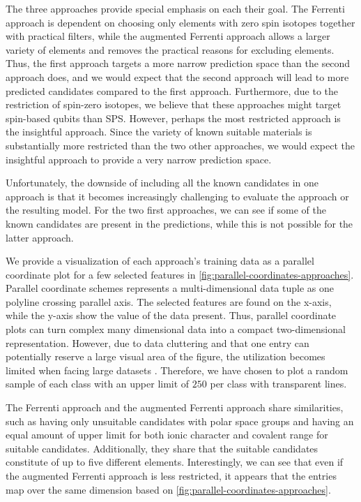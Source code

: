 The three approaches provide special emphasis on each their goal. The Ferrenti approach is dependent on choosing only elements with zero spin isotopes together with practical filters, while the augmented Ferrenti approach allows a larger variety of elements and removes the practical reasons for excluding elements. Thus, the first approach targets a more narrow prediction space than the second approach does, and we would expect that the second approach will lead to more predicted candidates compared to the first approach. Furthermore, due to the restriction of spin-zero isotopes, we believe that these approaches might target spin-based qubits than SPS.
However, perhaps the most restricted approach is the insightful approach. Since the variety of known suitable materials is substantially more restricted than the two other approaches, we would expect the insightful approach to provide a very narrow prediction space.


Unfortunately, the downside of including all the known candidates in one approach is that it becomes increasingly challenging to evaluate the approach or the resulting model. For the two first approaches, we can see if some of the known candidates are present in the predictions, while this is not possible for the latter approach.

We provide a visualization of each approach's training data as a parallel coordinate plot for a few selected features in \autoref{fig:parallel-coordinates-approaches}. Parallel coordinate schemes \cite{Inselberg1985, Inselberga1990} represents a multi-dimensional data tuple as one polyline crossing parallel axis. The selected features are found on the x-axis, while the y-axis show the value of the data present. Thus, parallel coordinate plots can turn complex many dimensional data into a compact two-dimensional representation. However, due to data cluttering and that one entry can potentially reserve a large visual area of the figure, the utilization becomes limited when facing large datasets \cite{Ericsona}. Therefore, we have chosen to plot a random sample of each class with an upper limit of $250$ per class with transparent lines.

The Ferrenti approach and the augmented Ferrenti approach share similarities, such as having only unsuitable candidates with polar space groups and having an equal amount of upper limit for both ionic character and covalent range for suitable candidates. Additionally, they share that the suitable candidates constitute of up to five different elements. Interestingly, we can see that even if the augmented Ferrenti approach is less restricted, it appears that the entries map over the same dimension based on \autoref{fig:parallel-coordinates-approaches}.

